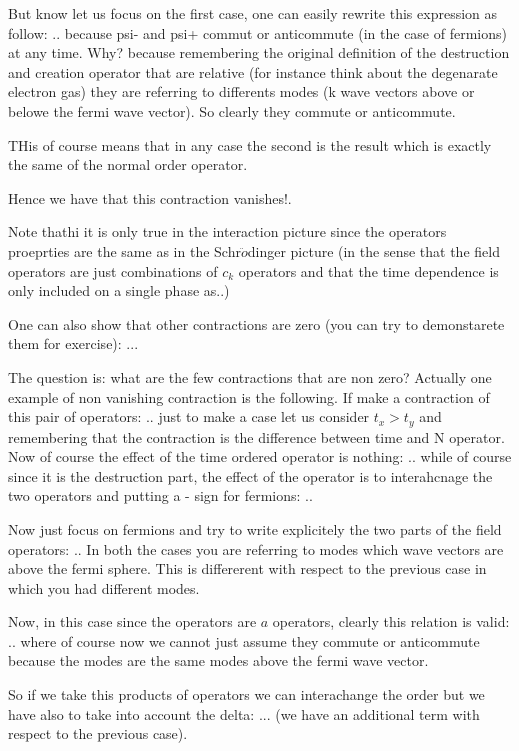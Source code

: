 \documentclass[../main/main.tex]{subfiles}
\begin{document}
But know let us focus on the first case, one can easily rewrite this expression as follow:
..
because psi- and psi+ commut or anticommute (in the case of fermions) at any time. Why? because remembering the original definition of the destruction and creation operator that are relative (for instance think about the degenarate electron gas) they are referring to differents modes (k wave vectors above or belowe the fermi wave vector). So clearly they commute or anticommute.

THis of course means that in any case the second is the result which is exactly the same of the normal order operator.

Hence we have that this contraction vanishes!.

Note thathi it is only true in the interaction picture since the operators proeprties are the same as in the Schr$\ddot{o}$dinger picture (in the sense that the field operators are just combinations of \( c_k \) operators and that the time dependence is only included on a single phase as..)


One can also show that other contractions are zero (you can try to demonstarete them for exercise):
...

The question is: what are the few contractions that are non zero?
Actually one example of non vanishing  contraction is the following. If make a contraction of this pair of operators:
..
just to make a case let us consider \( t_x>t_y \) and remembering that the contraction is the difference between time and N operator. Now of course the effect of the time ordered operator is nothing:
..
while of course since it is the destruction part, the effect of the operator is to interahcnage the two operators and putting a - sign for fermions:
..

Now just focus on fermions and try to write explicitely the two parts of the field operators:
..
In both the cases you are referring to modes which wave vectors are above the fermi sphere.
This is differerent with respect to the previous case in which you had different modes.

Now, in this case since the operators are \( a  \) operators, clearly this relation is valid:
..
where of course now we cannot just assume they commute or anticommute because the modes are the same modes above the fermi wave vector.

So if we take this products of operators we can interachange the order but we have also to take into account the delta:
...
(we have an additional term with respect to the previous case).
\end{document}
